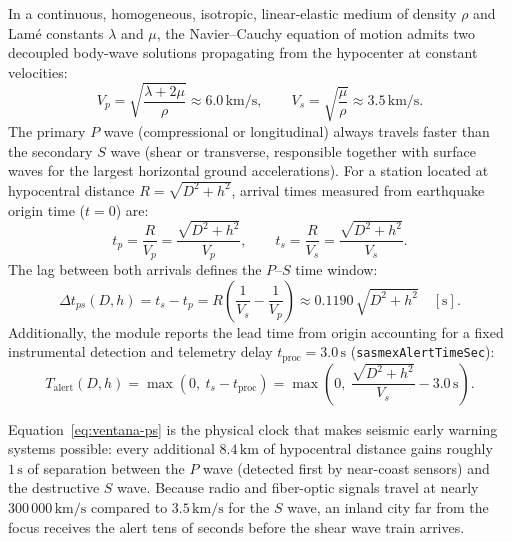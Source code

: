 \documentclass[11pt,a4paper]{article}
\newcommand{\unit}[1]{\mathrm{#1}}
\begin{document}
In a continuous, homogeneous, isotropic, linear-elastic medium of density $\rho$ and Lam\'e constants $\lambda$
and $\mu$, the Navier--Cauchy equation of motion admits two decoupled body-wave solutions propagating from the
hypocenter at constant velocities:
\begin{equation}
  V_p = \sqrt{\frac{\lambda + 2\mu}{\rho}} \approx 6.0\,\unit{km/s},
  \qquad
  V_s = \sqrt{\frac{\mu}{\rho}} \approx 3.5\,\unit{km/s}.
  \label{eq:velocidades-ps}
\end{equation}
The primary $P$ wave (compressional or longitudinal) always travels faster than the secondary $S$ wave (shear or
transverse, responsible together with surface waves for the largest horizontal ground accelerations). For a
station located at hypocentral distance $R = \sqrt{D^2 + h^2}$, arrival times measured from earthquake origin
time ($t=0$) are:
\begin{equation}
  t_p = \frac{R}{V_p} = \frac{\sqrt{D^2 + h^2}}{V_p},
  \qquad
  t_s = \frac{R}{V_s} = \frac{\sqrt{D^2 + h^2}}{V_s}.
  \label{eq:tiempos-arribo}
\end{equation}
The lag between both arrivals defines the $P\text{--}S$ time window:
\begin{equation}
  \Delta t_{ps}(D,h) = t_s - t_p = R\left(\frac{1}{V_s} - \frac{1}{V_p}\right)
  \approx 0.1190\,\sqrt{D^2 + h^2}\quad[\unit{s}].
  \label{eq:ventana-ps}
\end{equation}
Additionally, the module reports the lead time from origin accounting for a fixed instrumental detection and
telemetry delay $t_{\mathrm{proc}} = 3.0\,\unit{s}$ (\texttt{sasmexAlertTimeSec}):
\begin{equation}
  T_{\mathrm{alert}}(D,h) = \max\!\left(0,\ t_s - t_{\mathrm{proc}}\right)
  = \max\!\left(0,\ \frac{\sqrt{D^2 + h^2}}{V_s} - 3.0\,\unit{s}\right).
  \label{eq:tiempo-sasmex}
\end{equation}

\begin{intuicion}
Equation~\eqref{eq:ventana-ps} is the physical clock that makes seismic early warning systems possible: every
additional $8.4\,\unit{km}$ of hypocentral distance gains roughly $1\,\unit{s}$ of separation between the $P$
wave (detected first by near-coast sensors) and the destructive $S$ wave. Because radio and fiber-optic signals
travel at nearly $300\,000\,\unit{km/s}$ compared to $3.5\,\unit{km/s}$ for the $S$ wave, an inland city far from
the focus receives the alert tens of seconds before the shear wave train arrives.
\end{intuicion}
\end{document}
